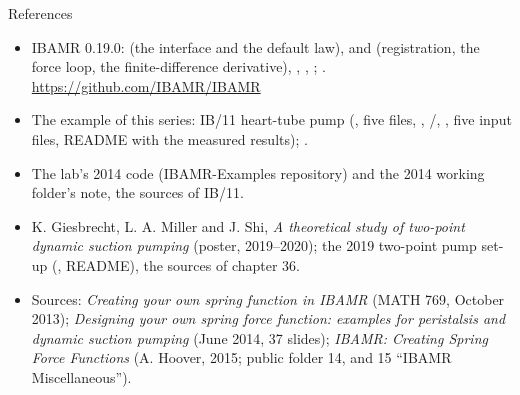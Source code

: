 \documentclass[aspectratio=169,11pt]{beamer}
\begin{document}
\begin{frame}{References}
\label{fr:refs}
\scriptsize
\begin{itemize}
  \item IBAMR 0.19.0:  (the interface and the default law),  and  (registration, the force loop, the finite-difference derivative), , , ; . \url{https://github.com/IBAMR/IBAMR}
  \item The example of this series: IB/11 heart-tube pump (, five  files, , /, , five input files, README with the measured results); .
  \item The lab's 2014  code (IBAMR-Examples repository) and the 2014 working folder's  note, the sources of IB/11.
  \item K. Giesbrecht, L. A. Miller and J. Shi, \emph{A theoretical study of two-point dynamic suction pumping} (poster, 2019--2020); the 2019 two-point pump set-up (, README), the sources of chapter 36.
  \item Sources: \emph{Creating your own spring function in IBAMR} (MATH 769, October 2013); \emph{Designing your own spring force function: examples for peristalsis and dynamic suction pumping} (June 2014, 37 slides); \emph{IBAMR: Creating Spring Force Functions} (A. Hoover, 2015; public folder 14, and 15 ``IBAMR Miscellaneous'').
\end{itemize}
\end{frame}
\end{document}
